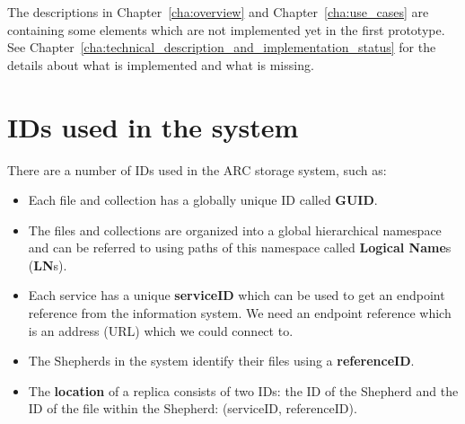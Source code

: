 \documentclass{book}
\begin{document}
\begin{figure}[ht]
\end{figure}

The descriptions in Chapter~\ref{cha:overview} and Chapter~\ref{cha:use_cases} are containing some elements which are not implemented yet in the first prototype. See Chapter~\ref{cha:technical_description_and_implementation_status} for the details about what is implemented and what is missing.

\section{IDs used in the system}
\label{sec:IDs}

There are a number of IDs used in the ARC storage system, such as:
\begin{itemize}
    \item Each file and collection has a globally unique ID called \textbf{GUID}.
    \item The files and collections are organized into a global hierarchical namespace and can be referred to using paths of this namespace called \textbf{Logical Name}s (\textbf{LN}s).
    \item Each service has a unique \textbf{serviceID} which can be used to get an endpoint reference from the information system. We need an endpoint reference which is an address (URL) which we could connect to.
    \item The Shepherds in the system identify their files using a \textbf{referenceID}.
    \item The \textbf{location} of a replica consists of two IDs: the ID of the Shepherd and the ID of the file within the Shepherd: (serviceID, referenceID).
\end{itemize}
\end{document}
